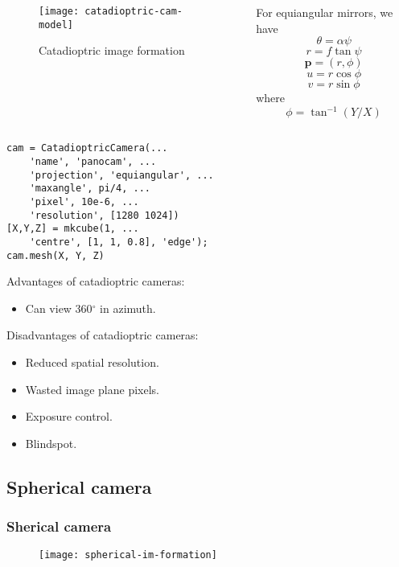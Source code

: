 \begin{frame}
\begin{columns}
\begin{column}{.6\textwidth}
\begin{figure}[!h]
\centering
\texttt{[image: catadioptric-cam-model]}
\caption{Catadioptric image formation}
\end{figure}
\end{column}
\begin{column}{.4\textwidth}
For equiangular mirrors, we have
\[
\theta = \alpha \psi
\]
\[
r = f \tan \psi
\]
\[
\textbf{p} = (r,\phi)
\]
\[
u = r\cos \phi
\]
\[
v = r\sin \phi
\]
where
\[
\phi = \tan^{-1} (Y/X)
\]
\end{column}
\end{columns}
\end{frame}

\begin{frame}[fragile]
\begin{lstlisting}
cam = CatadioptricCamera(...
    'name', 'panocam', ...
    'projection', 'equiangular', ...
    'maxangle', pi/4, ...
    'pixel', 10e-6, ...
    'resolution', [1280 1024])
[X,Y,Z] = mkcube(1, ...
    'centre', [1, 1, 0.8], 'edge');
cam.mesh(X, Y, Z)
\end{lstlisting}
\end{frame}

\begin{frame}
Advantages of catadioptric cameras:
\begin{itemize}
\item Can view 360$^\circ$ in azimuth.
\end{itemize}
Disadvantages of catadioptric cameras:
\begin{itemize}
\item Reduced spatial resolution.
\item Wasted image plane pixels.
\item Exposure control.
\item Blindspot.
\end{itemize}
\end{frame}

\subsection{Spherical camera}

\begin{frame}
\frametitle{Sherical camera}
\begin{figure}[!h]
\centering
\texttt{[image: spherical-im-formation]}
\end{figure}
\end{frame}

